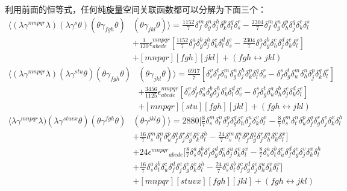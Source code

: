 利用前面的恒等式，任何纯旋量空间关联函数都可以分解为下面三个：
\begin{equation}
	\begin{aligned}
		\langle(\lambda\gamma^{mnpqr}\lambda)(\lambda\gamma^s\theta)(\theta\gamma_{fgh}\theta)&(\theta\gamma_{jkl}\theta)\rangle=\frac{1152}7\delta_f^m\delta_g^n\delta_j^h\delta_k^p\delta_l^q\delta_s^r-\frac{2304}7\delta_f^m\delta_g^n\delta_h^p\delta_j^q\delta_k^r\delta_l^s\\&+\frac1{120}\epsilon^{mnpqr}_{abcde}\left[\frac{1152}7\delta_f^a\delta_g^b\delta_j^h\delta_k^c\delta_l^d\delta_s^e-\frac{2304}7\delta_f^a\delta_g^b\delta_h^c\delta_j^d\delta_k^e\delta_l^s\right]\\&+[mnpqr][fgh][jkl]+(fgh\leftrightarrow jkl)
	\end{aligned}
\end{equation}
\begin{equation}
	\begin{aligned}
		\langle(\lambda\gamma^{mnpqr}\lambda)(\lambda\gamma^{stu}\theta)(\theta\gamma_{fgh}\theta)&(\theta\gamma_{jkl}\theta)\rangle=\frac{6917}7{\left[\delta_s^v\delta_f^t\delta_u^m\delta_g^n\delta_j^h\delta_k^p\delta_l^q\delta_v^r-\delta_f^s\delta_g^t\delta_u^m\delta_h^n\delta_j^p\delta_k^q\delta_l^r\right]}\\&+\frac{3456}{1125}\epsilon^{mnpqr}_{abcde}\left[\delta_s^v\delta_f^t\delta_u^a\delta_g^b\delta_j^h\delta_k^c\delta_l^d\delta_v^e-\delta_f^s\delta_g^t\delta_u^a\delta_h^b\delta_j^c\delta_k^d\delta_l^e\right]\\&+[mnpqr][stu][fgh][jkl]+(fgh\leftrightarrow jkl)
	\end{aligned}
\end{equation}
\begin{equation}
	\begin{aligned}
		\langle\lambda\gamma^{mnpqr}\lambda)(\lambda\gamma^{stuvx}\theta)(\theta\gamma^{fgh}\theta)&(\theta\gamma^{jkl}\theta)\rangle=2880\Big[\frac87\delta_s^m\delta_t^n\delta_f^p\delta_g^q\delta_h^r\delta_j^u\delta_k^v\delta_l^x-\frac87\delta_s^m\delta_t^n\delta_u^p\delta_f^q\delta_g^r\delta_j^v\delta_k^x\delta_l^h\\&+\frac{16}7\delta_s^m\delta_t^n\delta_u^p\delta_f^q\delta_j^r\delta_g^v\delta_k^x\delta_l^h-\frac{24}7\delta_s^m\delta_t^n\delta_f^p\delta_g^q\delta_j^r\delta_h^u\delta_k^v\delta_l^x\Big]\\&+24\epsilon^{mnpqr}{}_{abcde}{\Big[\frac87\delta_s^a\delta_t^b\delta_f^c\delta_g^d\delta_h^e\delta_j^u\delta_k^v\delta_l^x-\frac87\delta_s^a\delta_t^b\delta_u^c\delta_f^d\delta_g^e\delta_j^v\delta_k^x\delta_l^h}\\&+\frac{16}7\delta_s^a\delta_t^b\delta_u^c\delta_f^d\delta_j^e\delta_g^v\delta_k^x\delta_l^h-\frac{24}7\delta_s^a\delta_t^b\delta_f^c\delta_g^d\delta_j^e\delta_h^u\delta_k^v\delta_l^x\Big]\\&+[mnpqr][stuvx][fgh][jkl]+(fgh\leftrightarrow jkl)
	\end{aligned}
\end{equation}
